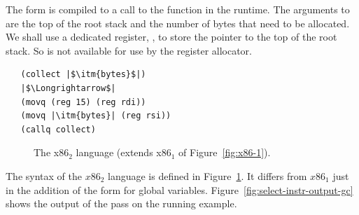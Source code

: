 \documentclass[11pt]{book}
\newcommand{\gray}[1]{{\color{lightgray} #1}}
\begin{document}
The  form is compiled to a call to the 
function in the runtime. The arguments to  are the top
of the root stack and the number of bytes that need to be allocated.
We shall use a dedicated register, , to store the pointer to
the top of the root stack. So  is not available for use by
the register allocator.
\begin{lstlisting}
   (collect |$\itm{bytes}$|)
   |$\Longrightarrow$|
   (movq (reg 15) (reg rdi))
   (movq |\itm{bytes}| (reg rsi))
   (callq collect)
\end{lstlisting}


\begin{figure}[tp]
\fbox{
\begin{minipage}{0.96\textwidth}
\[
\begin{array}{lcl}
\Arg &::=&  \gray{  \INT{\Int} \mid \REG{\itm{register}}
    \mid (\key{deref}\,\itm{register}\,\Int) } \\
   &\mid& \gray{ (\key{byte-reg}\; \itm{register})  }
   \mid (\key{global-value}\; \itm{name}) \\
\itm{cc} & ::= & \gray{  \key{e} \mid \key{l} \mid \key{le} \mid \key{g} \mid \key{ge}  } \\
\Instr &::=& \gray{(\key{addq} \; \Arg\; \Arg) \mid
             (\key{subq} \; \Arg\; \Arg) \mid
             (\key{negq} \; \Arg) \mid (\key{movq} \; \Arg\; \Arg)} \\
      &\mid& \gray{(\key{callq} \; \mathit{label}) \mid
             (\key{pushq}\;\Arg) \mid
             (\key{popq}\;\Arg) \mid
             (\key{retq})} \\
       &\mid& \gray{  (\key{xorq} \; \Arg\;\Arg)
       \mid (\key{cmpq} \; \Arg\; \Arg) \mid (\key{set}\itm{cc} \; \Arg)  } \\
       &\mid& \gray{  (\key{movzbq}\;\Arg\;\Arg)
       \mid  (\key{jmp} \; \itm{label})
       \mid (\key{j}\itm{cc} \; \itm{label})
       \mid (\key{label} \; \itm{label})  } \\
x86_2 &::= & \gray{  (\key{program} \;\itm{info} \;(\key{type}\;\itm{type})\; \Instr^{+})  }
\end{array}
\]
\end{minipage}
}
\caption{The x86$_2$ language (extends x86$_1$ of Figure~\ref{fig:x86-1}).}
\label{fig:x86-2}
\end{figure}

The syntax of the $x86_2$ language is defined in
Figure~\ref{fig:x86-2}.  It differs from $x86_1$ just in the addition
of the form for global variables.
%
Figure~\ref{fig:select-instr-output-gc} shows the output of the
 pass on the running example.
\end{document}
